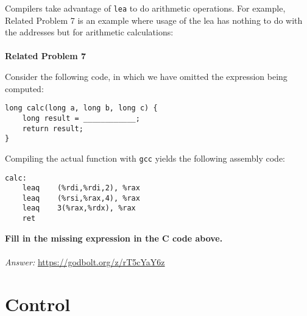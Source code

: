\documentclass{article}
\begin{document}
Compilers take advantage of \texttt{lea} to do arithmetic operations. For example, Related Problem 7 is an example where usage of the lea has nothing to do with the addresses but for arithmetic calculations: \\
\\
\noindent\textbf{Related Problem 7}

Consider the following code, in which we have omitted the expression being computed:

\begin{verbatim}
long calc(long a, long b, long c) {
    long result = ____________;
    return result;
}
\end{verbatim}

Compiling the actual function with \texttt{gcc} yields the following assembly code:

\begin{verbatim}
calc:
    leaq    (%rdi,%rdi,2), %rax
    leaq    (%rsi,%rax,4), %rax
    leaq    3(%rax,%rdx), %rax
    ret
\end{verbatim}
\textbf{Fill in the missing expression in the C code above.} \\
\\
\textit{Answer: }\url{https://godbolt.org/z/rT5cYaY6z}
\section{Control}
\end{document}
